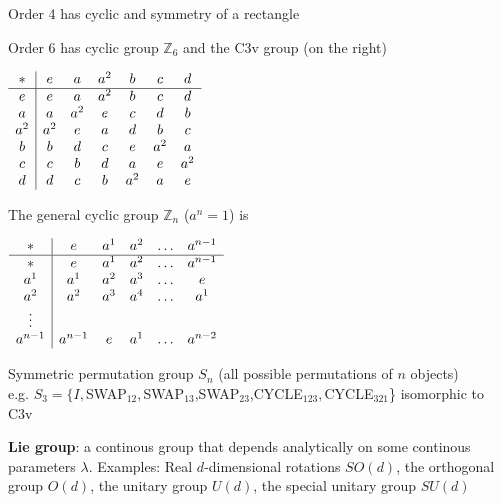 \begin{squishlist}
    \item Order 4 has cyclic and symmetry of a rectangle
    
    \begin{minipage}{0.5\columnwidth}
        \item Order 6 has cyclic group $\mathbb{Z}_6$ and the C3v group (on the right)
    \end{minipage}
    \begin{minipage}{0.5\columnwidth}
        $\begin{array}{c | c c c c c c }
            * & e & a & a^2 & b & c & d \\
            \hline
            e & e & a & a^2 & b & c & d \\
            a & a & a^2 & e & c & d & b \\
            a^2 & a^2 & e & a & d    & b    & c     \\
            b   & b  & d & c & e   & a^2 & a  \\
            c   & c  & b & d & a   & e   & a^2 \\
            d   & d  & c & b & a^2 & a   & e                        
        \end{array}$
    \end{minipage}

    \begin{minipage}{0.4\columnwidth}
    \item The general cyclic group $\mathbb{Z}_n$ ($a^n = 1$) is
    \end{minipage}
    $\begin{array}{c| c c c c c}
        * & e & a^1 & a^2 & \ldots & a^{n-1} \\
        \hline
        * & e & a^1 & a^2 & \ldots & a^{n-1} \\
        a^1 & a^1 & a^2 & a^3 & \ldots & e \\
        a^2 & a^2 & a^3 & a^4 & \ldots & a^1 \\
        {\vdots} \\
        a^{n-1} & a^{n-1} & e & a^1 & \ldots & a^{n-2}
    \end{array}$

    \item Symmetric permutation group $S_n$ (all possible permutations of $n$ objects)\\
    e.g. $S_3 = \{ I,$SWAP$_{12},$SWAP$_{13}$,SWAP$_{23}$,CYCLE$_{123},$CYCLE$_{321}$\} isomorphic to C3v

    \item \textbf{Lie group}: a continous group that depends analytically on some continous parameters $\lambda$. Examples: Real $d$-dimensional rotations $SO(d)$, the orthogonal group $O(d)$, the unitary group $U(d)$, the special unitary group $SU(d)$
    

\end{squishlist}
